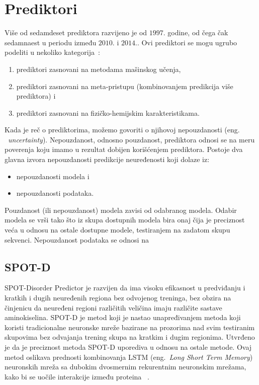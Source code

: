 \section{Prediktori}

Više od sedamdeset prediktora razvijeno je od $1997.$ godine, od čega čak sedamnaest u periodu između $2010.$ i $2014.$. Ovi prediktori se mogu ugrubo podeliti u nekoliko kategorija~\cite{PredictorsOverview}:
\begin{enumerate}
\item prediktori zasnovani na metodama mašinskog učenja,
\item prediktori zasnovani na meta-pristupu (kombinovanjem predikcija više prediktora) i 
\item prediktori zasnovani na fizičko-hemijskim karakteristikama.
\end{enumerate}

Kada je reč o prediktorima, možemo govoriti o njihovoj nepouzdanosti (eng. ~{\em  uncertainty}). Nepouzdanost, odnosno pouzdanost, prediktora odnosi se na meru poverenja koju imamo u rezultat dobijen korišćenjem prediktora. Postoje dva glavna izvora nepouzdanosti predikcije neuređenosti koji dolaze iz:
\begin{itemize}
\item nepouzdanosti modela i
\item nepouzdanosti podataka.
\end{itemize}

Pouzdanost (ili nepouzdanost) modela zavisi od odabranog modela. Odabir modela se vrši tako što iz skupa dostupnih modela bira onaj čija je preciznost veća u odnosu na ostale dostupne modele, testiranjem na zadatom skupu sekvenci.
Nepouzdanost podataka se odnosi na  ~\cite{MolBioSyst}


\subsection{SPOT-D}

SPOT-Disorder Predictor je razvijen da ima visoku efikasnost u predviđanju i kratkih i dugih neuređenih regiona bez odvojenog treninga, bez obzira na činjenicu da neuređeni regioni različitih veličina imaju različite sastave aminokiselina. SPOT-D je metod koji je nastao unapređivanjem metoda koji koristi tradicionalne neuronske mreže bazirane na prozorima nad svim testiranim skupovima bez odvajanja trening skupa na kratkim i dugim regionima. Utvrđeno je da je preciznost metoda SPOT-D uporediva u odnosu na ostale metode. Ovaj metod oslikava prednosti kombinovanja LSTM (eng.~{\em Long Short Term Memory}) neuronskih mreža sa dubokim dvosmernim rekurentnim neuronskim mrežama, kako bi se uočile interakcije između proteina
~\cite{SPOTD}.




